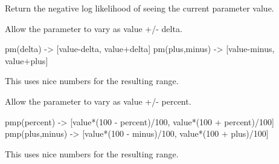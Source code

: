 \documentclass[letterpaper,10pt,english]{sphinxmanual}
\begin{document}
\begin{fulllineitems}

\begin{fulllineitems}
\label{api/mystic.parameter:refl1d.mystic.parameter.Function.nllf}
Return the negative log likelihood of seeing the current parameter value.

\end{fulllineitems}


\begin{fulllineitems}
\label{api/mystic.parameter:refl1d.mystic.parameter.Function.op}
\end{fulllineitems}


\begin{fulllineitems}
\label{api/mystic.parameter:refl1d.mystic.parameter.Function.parameters}
\end{fulllineitems}


\begin{fulllineitems}
\label{api/mystic.parameter:refl1d.mystic.parameter.Function.pm}
Allow the parameter to vary as value +/- delta.

pm(delta) -\textgreater{} {[}value-delta, value+delta{]}
pm(plus,minus) -\textgreater{} {[}value-minus, value+plus{]}

This uses nice numbers for the resulting range.

\end{fulllineitems}


\begin{fulllineitems}
\label{api/mystic.parameter:refl1d.mystic.parameter.Function.pmp}
Allow the parameter to vary as value +/- percent.

pmp(percent) -\textgreater{} {[}value*(100 - percent)/100, value*(100 + percent)/100{]}
pmp(plus,minus) -\textgreater{} {[}value*(100 - minus)/100, value*(100 + plus)/100{]}

This uses nice numbers for the resulting range.


\end{fulllineitems}
\end{fulllineitems}
\end{document}
